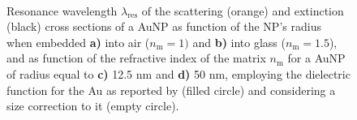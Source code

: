 
%
%
%



\begin{figure}
    \hspace*{-18.75em}%
    \vspace*{-1.25em}%
        \begin{subfigure}{.375\textwidth}\caption{ }\label{sfig:red:1}\end{subfigure}%
        \begin{subfigure}{.25\textwidth}\caption{ }\label{sfig:red:2}\end{subfigure} \\
    \def\svgwidth{.95\textwidth}
    \small
    \centering
    \vspace*{0em}
    \caption[Spectral redshift of the scattering and extinction of a spherical AuNP as function of its size and the embedding media]{Resonance wavelength $\lambda_\text{res}$ of the scattering (orange) and extinction (black) cross sections of a AuNP as function of the NP's radius when embedded \textbf{a)} into air ($n_\text{m} = 1)$ and \textbf{b)} into glass ($n_\text{m} = 1.5$), and as function of the refractive index of the matrix  $n_\text{m}$ for a AuNP of radius equal to  \textbf{c)} 12.5 nm and \textbf{d)} 50 nm, employing the dielectric function for the Au as reported by \citeauthor{johnson_optical_1972} (filled circle) and considering a size correction to it (empty circle).}
\end{figure}



